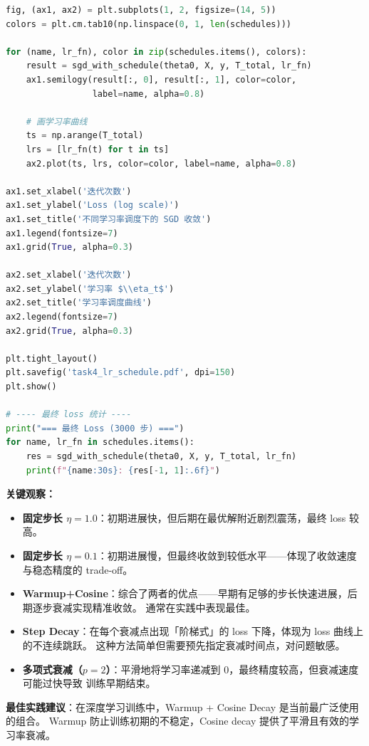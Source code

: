 \documentclass[12pt,a4paper]{ctexart}
\theoremstyle{definition}
\theoremstyle{plain}
\begin{document}
\begin{lstlisting}[language=Python, caption={学习率调度策略对比}]
fig, (ax1, ax2) = plt.subplots(1, 2, figsize=(14, 5))
colors = plt.cm.tab10(np.linspace(0, 1, len(schedules)))

for (name, lr_fn), color in zip(schedules.items(), colors):
    result = sgd_with_schedule(theta0, X, y, T_total, lr_fn)
    ax1.semilogy(result[:, 0], result[:, 1], color=color,
                 label=name, alpha=0.8)

    # 画学习率曲线
    ts = np.arange(T_total)
    lrs = [lr_fn(t) for t in ts]
    ax2.plot(ts, lrs, color=color, label=name, alpha=0.8)

ax1.set_xlabel('迭代次数')
ax1.set_ylabel('Loss (log scale)')
ax1.set_title('不同学习率调度下的 SGD 收敛')
ax1.legend(fontsize=7)
ax1.grid(True, alpha=0.3)

ax2.set_xlabel('迭代次数')
ax2.set_ylabel('学习率 $\\eta_t$')
ax2.set_title('学习率调度曲线')
ax2.legend(fontsize=7)
ax2.grid(True, alpha=0.3)

plt.tight_layout()
plt.savefig('task4_lr_schedule.pdf', dpi=150)
plt.show()

# ---- 最终 loss 统计 ----
print("=== 最终 Loss (3000 步) ===")
for name, lr_fn in schedules.items():
    res = sgd_with_schedule(theta0, X, y, T_total, lr_fn)
    print(f"{name:30s}: {res[-1, 1]:.6f}")
\end{lstlisting}

\textbf{关键观察：}

\begin{itemize}
  \item \textbf{固定步长 $\eta=1.0$}：初期进展快，但后期在最优解附近剧烈震荡，最终 loss 较高。
  \item \textbf{固定步长 $\eta=0.1$}：初期进展慢，但最终收敛到较低水平——体现了收敛速度与稳态精度的 trade-off。
  \item \textbf{Warmup+Cosine}：综合了两者的优点——早期有足够的步长快速进展，后期逐步衰减实现精准收敛。
    通常在实践中表现最佳。
  \item \textbf{Step Decay}：在每个衰减点出现「阶梯式」的 loss 下降，体现为 loss 曲线上的不连续跳跃。
    这种方法简单但需要预先指定衰减时间点，对问题敏感。
  \item \textbf{多项式衰减（$p=2$）}：平滑地将学习率递减到 0，最终精度较高，但衰减速度可能过快导致
    训练早期结束。
\end{itemize}

\noindent\textbf{最佳实践建议}：在深度学习训练中，Warmup + Cosine Decay 是当前最广泛使用的组合。
Warmup 防止训练初期的不稳定，Cosine decay 提供了平滑且有效的学习率衰减。
\end{document}
